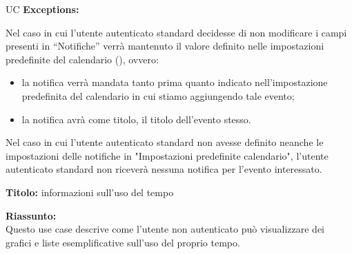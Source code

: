 \begin{listaPersonale}{UC}
    \textbf{Exceptions:}
    \begin{enumerate}[label=\textbf{[exception \arabic{enumii}]}, ref= \textbf{[exception \arabic{enumii}]}]
         Nel caso in cui l'utente autenticato standard decidesse di non modificare i campi presenti in “Notifiche” verrà mantenuto il valore definito nelle impostazioni predefinite del calendario (), ovvero:
        \begin{itemize}
            \item la notifica verrà mandata tanto prima quanto indicato nell'impostazione predefinita del calendario in cui stiamo aggiungendo tale evento;
            \item la notifica avrà come titolo, il titolo dell'evento stesso.
        \end{itemize}
         Nel caso in cui l'utente autenticato standard non avesse definito neanche le impostazioni delle notifiche in "Impostazioni predefinite calendario", l'utente autenticato standard non riceverà nessuna notifica per l'evento interessato.
    \end{enumerate}









    \newpage


    \begin{center}
        
    \end{center}

    \textbf{Titolo:} informazioni sull'uso del tempo

    \textbf{Riassunto:} \\
    Questo use case descrive come l'utente non autenticato può visualizzare dei grafici e liste esemplificative sull'uso del proprio tempo.


\end{listaPersonale}
